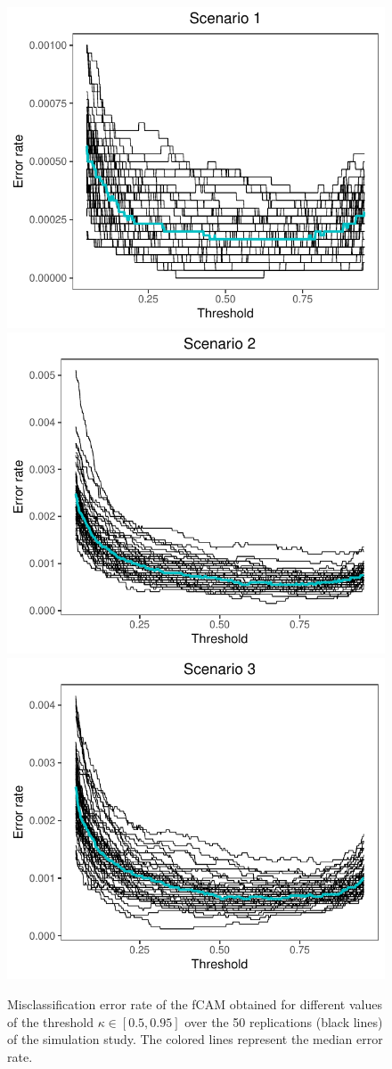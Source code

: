 \begin{figure}
	\centering
	\includegraphics[width = .49\textwidth]{_Images/review_scen1.pdf}
	\hfill
	\includegraphics[width = .49\textwidth]{_Images/review_scen2.pdf}
	\includegraphics[width = .49\textwidth]{_Images/review_scen3.pdf}
	\caption[Misclassification error rate obtained for different values of the threshold $\kappa$ in the simulation study.]{Misclassification error rate of the fCAM obtained for different values of the threshold $\kappa \in [0.5,0.95]$ over the 50 replications (black lines) of the simulation study. The colored lines represent the median error rate.}
	\label{fig:threshold_err_rate}
\end{figure}


